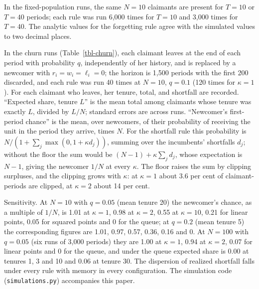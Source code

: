 \documentclass[
  11pt,
  letterpaper,
  DIV=11,
  numbers=noendperiod,
  twoside]{scrartcl}
\begin{document}
In the fixed-population runs, the same \(N = 10\) claimants are present
for \(T = 10\) or \(T = 40\) periods; each rule was run 6,000 times for
\(T = 10\) and 3,000 times for \(T = 40\). The analytic values for the
forgetting rule agree with the simulated values to two decimal places.

In the churn runs (Table~\ref{tbl-churn}), each claimant leaves at the
end of each period with probability \(q\), independently of her history,
and is replaced by a newcomer with \(r_i = w_i = \ell_i = 0\); the
horizon is 1,500 periods with the first 200 discarded, and each rule was
run 40 times at \(N = 10\), \(q = 0.1\) (120 times for \(\kappa = 1\)).
For each claimant who leaves, her tenure, total, and shortfall are
recorded. ``Expected share, tenure \(L\)'' is the mean total among
claimants whose tenure was exactly \(L\), divided by \(L/N\); standard
errors are across runs. ``Newcomer's first-period chance'' is the mean,
over newcomers, of their probability of receiving the unit in the period
they arrive, times \(N\). For the shortfall rule this probability is
\(N/(1 + \sum_j \max(0, 1 + \kappa d_j))\), summing over the incumbents'
shortfalls \(d_j\); without the floor the sum would be
\((N-1) + \kappa \sum_j d_j\), whose expectation is \(N - 1\), giving
the newcomer \(1/N\) at every \(\kappa\). The floor raises the sum by
clipping surpluses, and the clipping grows with \(\kappa\): at
\(\kappa = 1\) about 3.6 per cent of claimant-periods are clipped, at
\(\kappa = 2\) about 14 per cent.

Sensitivity. At \(N = 10\) with \(q = 0.05\) (mean tenure 20) the
newcomer's chance, as a multiple of \(1/N\), is 1.01 at \(\kappa = 1\),
0.98 at \(\kappa = 2\), 0.55 at \(\kappa = 10\), 0.21 for linear points,
0.05 for squared points and 0 for the queue; at \(q = 0.2\) (mean tenure
5) the corresponding figures are 1.01, 0.97, 0.57, 0.36, 0.16 and 0. At
\(N = 100\) with \(q = 0.05\) (six runs of 3,000 periods) they are 1.00
at \(\kappa = 1\), 0.94 at \(\kappa = 2\), 0.07 for linear points and 0
for the queue, and under the queue expected share is 0.00 at tenures 1,
3 and 10 and 0.06 at tenure 30. The dispersion of realized shortfall
falls under every rule with memory in every configuration. The
simulation code (\texttt{simulations.py}) accompanies this paper.
\end{document}

